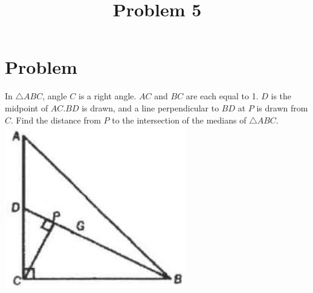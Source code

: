 \documentclass{article}
\title{Problem 5}
\date{}
\begin{document}
\maketitle

\section*{Problem}
In \(\triangle A B C\), angle \(C\) is a right angle. \(A C\) and \(B C\) are each equal to 1. \(D\) is the midpoint of \(A C . B D\) is drawn, and a line perpendicular to \(B D\) at \(P\) is drawn from \(C\). Find the distance from \(P\) to the intersection of the medians of \(\triangle A B C\).\\
\centering
\includegraphics[width=\textwidth]{images/problem_image_1.jpg}
\end{document}
